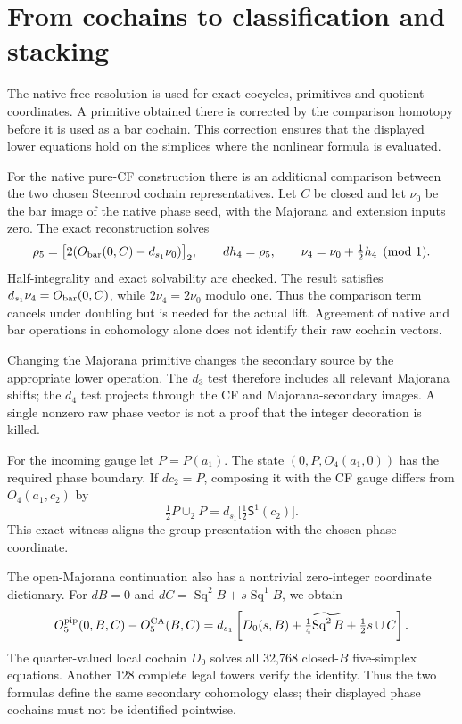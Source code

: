\documentclass[11pt]{article}
\newcommand{\Sq}{\operatorname{Sq}}
\newcommand{\SSq}{\mathsf S}
\newcommand{\dd}{d_{s_1}}
\newcommand{\lift}[1]{\widetilde{#1}}
\begin{document}
\section{From cochains to classification and stacking}
The native free resolution is used for exact cocycles, primitives and
quotient coordinates. A primitive obtained there is corrected by the
comparison homotopy before it is used as a bar cochain. This correction
ensures that the displayed lower equations hold on the simplices where
the nonlinear formula is evaluated.

For the native pure-CF construction there is an additional comparison
between the two chosen Steenrod cochain representatives. Let $C$ be closed
and let $\nu_0$ be the bar image of the native phase seed, with the Majorana
and extension inputs zero. The exact reconstruction solves
\begin{equation}
 \rho_5=\bigl[2(O_{\rm bar}(0,C)-\dd\nu_0)\bigr]_2,
 \qquad dh_4=\rho_5,\qquad \nu_4=\nu_0+\tfrac12h_4\pmod1.
\end{equation}
Half-integrality and exact solvability are checked. The result satisfies
$\dd\nu_4=O_{\rm bar}(0,C)$, while $2\nu_4=2\nu_0$ modulo one.
Thus the comparison term cancels under doubling but is needed for the
actual lift. Agreement of native and bar operations in cohomology alone
does not identify their raw cochain vectors.

Changing the Majorana primitive changes the secondary source by the
appropriate lower operation. The $d_3$ test therefore includes all
relevant Majorana shifts; the $d_4$ test projects through the CF and
Majorana-secondary images. A single nonzero raw phase vector is not a
proof that the integer decoration is killed.

For the incoming gauge let $P=P(a_1)$. The state
$(0,P,O_4(a_1,0))$ has the required phase boundary. If $dc_2=P$, composing
it with the CF gauge differs from $O_4(a_1,c_2)$ by
\begin{equation}
 \tfrac12P\cup_2P=\dd\bigl[\tfrac12\SSq^1(c_2)\bigr].
\end{equation}
This exact witness aligns the group presentation with the chosen phase
coordinate.

The open-Majorana continuation also has a nontrivial zero-integer
coordinate dictionary. For $dB=0$ and $dC=\Sq^2B+s\Sq^1B$, we obtain
\begin{equation}
 O_5^{\rm pip}(0,B,C)-O_5^{\rm CA}(B,C)
 =\dd\left[D_0(s,B)+\tfrac14\lift{\Sq^2B}
                         +\tfrac12s\cup C\right].
\end{equation}
The quarter-valued local cochain $D_0$ solves all 32,768 closed-$B$
five-simplex equations. Another 128 complete legal towers verify the
identity. Thus the two formulas define the same secondary cohomology
class; their displayed phase cochains must not be identified pointwise.
\end{document}
